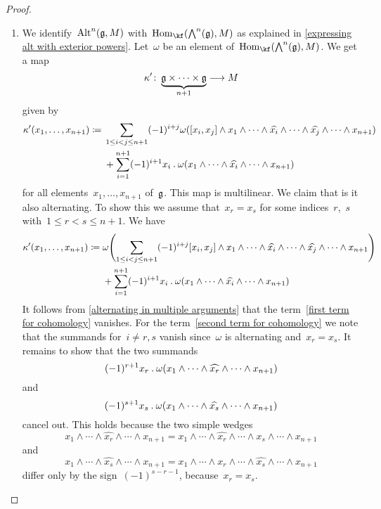 \begin{proof}
\begin{enumerate}
    \item
      We identify~$\operatorname{Alt}^n(\mathfrak{g}, M)$ with~$\Hom_{\kf}( \Exterior^n(\glie), M)$ as explained in \cref{expressing alt with exterior powers}.
      Let~$\omega$ be an element of~$\Hom_{\kf}( \Exterior^n(\glie), M )$.
      We get a map
      \[
        \kappa'
        \colon
        \underbrace{ \glie \times \dotsb \times \glie }_{n+1}
        \to
        M
      \]
      given by
      \begin{align*}
        \kappa'(x_1, \dotsc, x_{n+1})
        \coloneqq
        {}&
        \sum_{1 \leq i < j \leq n+1}
        (-1)^{i+j}
        \omega
        (
          [x_i, x_j] \wedge x_1 \wedge \dotsb \wedge \widehat{x_i} \wedge \dotsb \wedge \widehat{x_j} \wedge \dotsb \wedge x_{n+1}
        )
        \\
        {}&
        +
        \sum_{i=1}^{n+1}
        (-1)^{i+1}
        x_i \mathbin{.} \omega(x_1 \wedge \dotsb \wedge \widehat{x_i} \wedge \dotsb \wedge x_{n+1})
      \end{align*}
      for all elements~$x_1, \dotsc, x_{n+1}$ of~$\mathfrak{g}$.
      This map is multilinear.
      We claim that is it also alternating.
      To show this we assume that~$x_r = x_s$ for some indices~$r$,~$s$ with~$1 \leq r < s \leq n+1$.
      We have
      \begin{align}
        \kappa'(x_1, \dotsc, x_{n+1})
        \coloneqq
        {}&
        \omega
        \Biggl(
          \sum_{1 \leq i < j \leq n+1}
          (-1)^{i+j}
          [x_i, x_j] \wedge x_1 \wedge \dotsb \wedge \widehat{x_i} \wedge \dotsb \wedge \widehat{x_j} \wedge \dotsb \wedge x_{n+1}
        \Biggr)
        \label{first term for cohomology}
        \\
        {}&
        +
        \sum_{i=1}^{n+1}
        (-1)^{i+1}
        x_i \mathbin{.} \omega(x_1 \wedge \dotsb \wedge \widehat{x_i} \wedge \dotsb \wedge x_{n+1})
        \label{second term for cohomology}
      \end{align}
      It follows from \cref{alternating in multiple arguments} that the term~\eqref{first term for cohomology} vanishes.
      For the term~\eqref{second term for cohomology} we note that the summands for~$i \neq r,s$ vanish since~$\omega$ is alternating and~$x_r = x_s$.
      It remains to show that the two summands
      \[
        (-1)^{r+1}
        x_r \mathbin{.} \omega(x_1 \wedge \dotsb \wedge \widehat{x_r} \wedge \dotsb \wedge x_{n+1})
      \]
      and
      \[
        (-1)^{s+1}
        x_s \mathbin{.} \omega(x_1 \wedge \dotsb \wedge \widehat{x_s} \wedge \dotsb \wedge x_{n+1})
      \]
      cancel out.
      This holds because the two simple wedges
      \[
        x_1 \wedge \dotsb \wedge \widehat{x_r} \wedge \dotsb \wedge x_{n+1}
        =
        x_1 \wedge \dotsb \wedge \widehat{x_r} \wedge \dotsb \wedge x_s \wedge \dotsb \wedge x_{n+1}
      \]
      and
      \[
        x_1 \wedge \dotsb \wedge \widehat{x_s} \wedge \dotsb \wedge x_{n+1}
        =
        x_1 \wedge \dotsb \wedge x_r \wedge \dotsb \wedge \widehat{x_s} \wedge \dotsb \wedge x_{n+1}
      \]
      differ only by the sign~$(-1)^{s-r-1}$, because~$x_r = x_s$.


\end{enumerate}
\end{proof}

